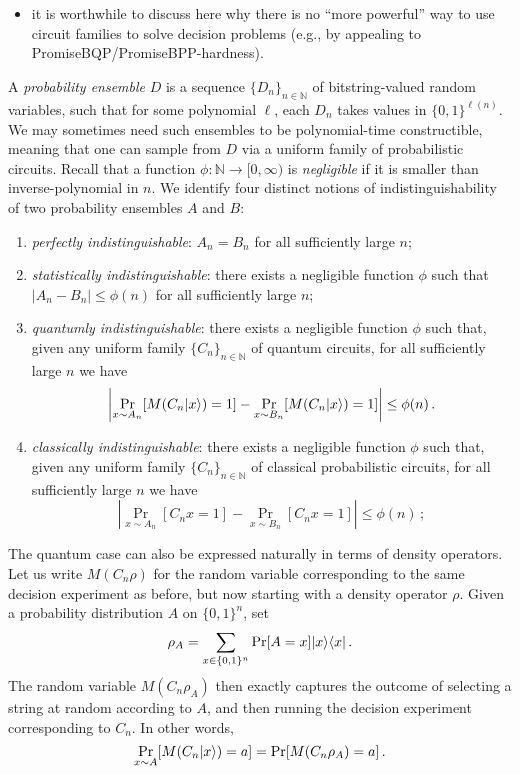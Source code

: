 \documentclass[11pt]{article}
\numberwithin{equation}{section}
\newcommand{\N}{\mathbb{N}}
\begin{document}
\begin{itemize}
\item it is worthwhile to discuss here why there is no ``more powerful'' way to use circuit families to solve decision problems (e.g., by appealing to PromiseBQP/PromiseBPP-hardness).
\end{itemize}

A \emph{probability ensemble} $D$ is a sequence $\{D_n\}_{n \in \N}$ of bitstring-valued random variables, such that for some polynomial $\ell$, each $D_n$ takes values in $\{0,1\}^{\ell(n)}$. We may sometimes need such ensembles to be polynomial-time constructible, meaning that one can sample from $D$ via a uniform family of probabilistic circuits. Recall that a function $\phi: \N \rightarrow [0, \infty)$ is \emph{negligible} if it is smaller than inverse-polynomial in $n$.  We identify four distinct notions of indistinguishability of two probability ensembles $A$ and $B$:
\begin{enumerate}
\item \emph{perfectly indistinguishable}: $A_n = B_n$ for all sufficiently large $n$;
\item \emph{statistically indistinguishable}: there exists a negligible function $\phi$ such that $|A_n - B_n| \leq \phi(n)$ for all sufficiently large $n$;
\item \emph{quantumly indistinguishable}: there exists a negligible function $\phi$ such that, given any uniform family $\{C_n\}_{n \in \N}$ of quantum circuits, for all sufficiently large $n$ we have
$$
\left| \Pr_{x \sim A_n} [M(C_n {\left\vert{x}\right\rangle}) = 1] - \Pr_{x \sim B_n} [M(C_n {\left\vert{x}\right\rangle}) = 1] \right| \leq \phi(n)\,.
$$
\item \emph{classically indistinguishable}: there exists a negligible function $\phi$ such that, given any uniform family $\{C_n\}_{n \in \N}$ of classical probabilistic circuits, for all sufficiently large $n$ we have
$$
\left| \Pr_{x \sim A_n} [C_n x = 1] - \Pr_{x \sim B_n}[C_n x = 1] \right| \leq \phi(n)\,;
$$
\end{enumerate}

The quantum case can also be expressed naturally in terms of density operators. Let us write $M(C_n \rho)$ for the random variable corresponding to the same decision experiment as before, but now starting with a density operator $\rho$. Given a probability distribution $A$ on $\{0,1\}^n$, set
$$
\rho_A = \sum_{x \in \{0,1\}^n} \Pr[A = x] {\left\vert{x}\right\rangle} {\left\langle{x}\right\vert}\,.
$$
The random variable $M(C_n \rho_A)$ then exactly captures the outcome of selecting a string at random according to $A$, and then running the decision experiment corresponding to $C_n$. In other words,
$$
\Pr_{x \sim A} [M(C_n {\left\vert{x}\right\rangle}) = a] = \Pr[M(C_n \rho_A) = a]\,.
$$
\end{document}
